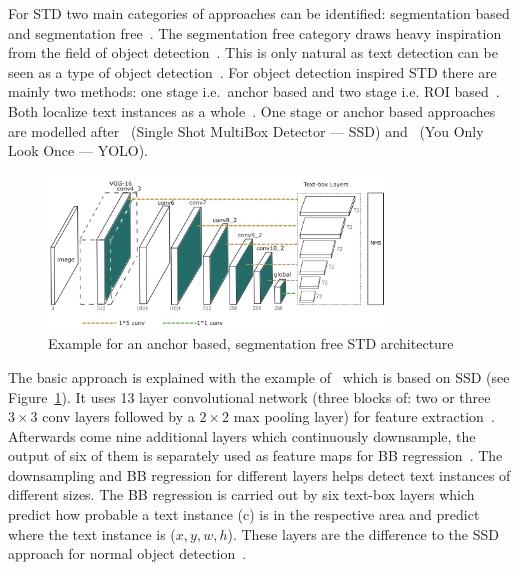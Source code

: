 For \ac{STD} two main categories of approaches can be identified: segmentation based and segmentation
free~\citep{long_scene_2021,sheng_centripetaltext_2021,liu_accurate_2020}.
The segmentation free category draws heavy inspiration from the field of object
detection~\citep{long_scene_2021,liu_accurate_2020}.
This is only natural as text detection can be seen as a type of object
detection~\citep{liu_accurate_2020,long_scene_2021}.
For object detection inspired \ac{STD} there are mainly two methods: one stage i.e.\ anchor based
and two stage i.e. \ac{ROI} based~\citep{long_scene_2021}.
Both localize text instances as a whole~\citep{long_scene_2021,sheng_centripetaltext_2021}.
One stage or anchor based approaches are modelled after~\cite{liu_ssd_2016} (Single Shot MultiBox
Detector --- SSD) and~\cite{redmon_you_2016} (You Only Look Once --- YOLO).
\begin{figure}[ht]
    \centering
    \includegraphics[width=0.8\textwidth]{img/STD-seg-free-Liao-TextBoxes-2017.png}
    \caption{Example for an anchor based, segmentation free STD
    architecture~\citep{liao_textboxes_2017}\label{fig:STD-segfree}}
\end{figure}
The basic approach is explained with the example of~\cite{liao_textboxes_2017} which is based on
SSD (see Figure~\ref{fig:STD-segfree}).
It uses 13 layer convolutional network (three blocks of: two or three $3\times3$ conv layers followed
by a $2\times2$ max pooling layer) for feature extraction~\citep{liao_textboxes_2017}.
Afterwards come nine additional layers which continuously downsample, the output of six of them
is separately used as feature maps for \ac{BB} regression~\citep{liao_textboxes_2017}.
The downsampling and \ac{BB} regression for different layers helps detect text instances of different
sizes.
%
The \ac{BB} regression is carried out by six text-box layers which predict how probable a text
instance (c) is in the respective area and predict where the text instance is ($x,y,w,h$).
These layers are the difference to the SSD approach for normal object
detection~\citep{liao_textboxes_2017,liu_ssd_2016}.
